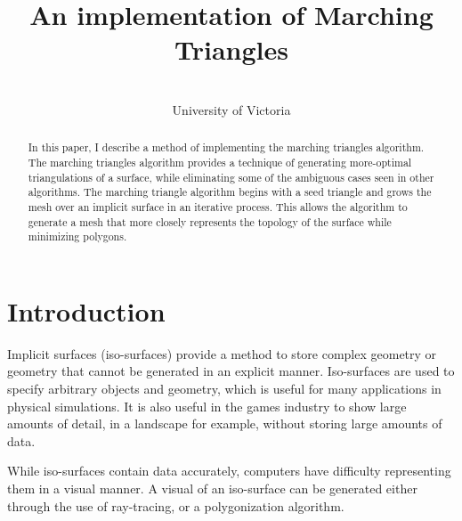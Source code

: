 \documentclass[conference]{acmsiggraph}
\title{An implementation of Marching Triangles}
\author{
	\Author \\
	University of Victoria\\
	\Email}
\begin{document}


\maketitle

\begin{abstract}
	In this paper, I describe a method of implementing the marching
	triangles algorithm. The marching triangles algorithm provides a
	technique of generating more-optimal triangulations of a surface, while
	eliminating some of the ambiguous cases seen in other algorithms.  The
	marching triangle algorithm begins with a seed triangle and grows the
	mesh over an implicit surface in an iterative process. This allows the
	algorithm to generate a mesh that more closely represents the topology
	of the surface while minimizing polygons.
\end{abstract}

\keywordlist

\copyrightspace


\section{Introduction}
Implicit surfaces (iso-surfaces) provide a method to store complex geometry or
geometry that cannot be generated in an explicit manner. Iso-surfaces are used
to specify arbitrary objects and geometry, which is useful for many
applications in physical simulations. It is also useful in the games industry
to show large amounts of detail, in a landscape for example, without storing
large amounts of data.

While iso-surfaces contain data accurately, computers have difficulty
representing them in a visual manner. A visual of an iso-surface can be
generated either through the use of ray-tracing, or a polygonization algorithm.
\end{document}

